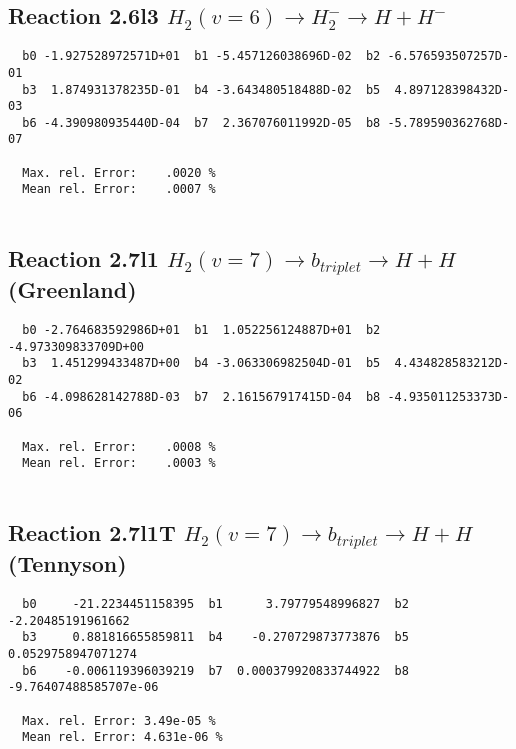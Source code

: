 \documentclass[12pt]{article}
\begin{document}
\subsection{
Reaction 2.6l3
 $ H_2(v=6) \rightarrow H_2^- \rightarrow H + H^-$
}


\begin{small}\begin{verbatim}
  b0 -1.927528972571D+01  b1 -5.457126038696D-02  b2 -6.576593507257D-01
  b3  1.874931378235D-01  b4 -3.643480518488D-02  b5  4.897128398432D-03
  b6 -4.390980935440D-04  b7  2.367076011992D-05  b8 -5.789590362768D-07

  Max. rel. Error:    .0020 %
  Mean rel. Error:    .0007 %


\end{verbatim}\end{small}


\newpage
\subsection{
Reaction 2.7l1
$ H_2(v=7) \rightarrow b_{triplet}\rightarrow H + H $ (Greenland) 
}


\begin{small}\begin{verbatim}
  b0 -2.764683592986D+01  b1  1.052256124887D+01  b2 -4.973309833709D+00
  b3  1.451299433487D+00  b4 -3.063306982504D-01  b5  4.434828583212D-02
  b6 -4.098628142788D-03  b7  2.161567917415D-04  b8 -4.935011253373D-06

  Max. rel. Error:    .0008 %
  Mean rel. Error:    .0003 %


\end{verbatim}\end{small}


\subsection{
Reaction 2.7l1T
$  H_2(v=7) \rightarrow b_{triplet}\rightarrow H + H $ (Tennyson)
}


\begin{small}\begin{verbatim}
  b0     -21.2234451158395  b1      3.79779548996827  b2     -2.20485191961662
  b3     0.881816655859811  b4    -0.270729873773876  b5    0.0529758947071274
  b6    -0.006119396039219  b7  0.000379920833744922  b8 -9.76407488585707e-06

  Max. rel. Error: 3.49e-05 %
  Mean rel. Error: 4.631e-06 %
\end{verbatim}\end{small}
\end{document}
